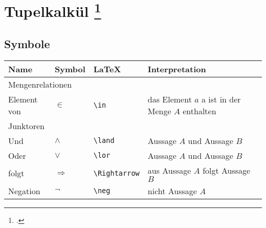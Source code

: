 \documentclass{lehramt-informatik}
\begin{document}

\chapter{Tupelkalkül
\footcite[Seite 100]{kemper}}

%

\section{Symbole}

\begin{tabular}{l|l|l|l}
\textbf{Name} & \textbf{Symbol} & \textbf{LaTeX} & \textbf{Interpretation}\\

\hline
\hline

\multicolumn{4}{l}{Mengenrelationen} \\

\hline
\hline

Element von & $\in$ & \verb|\in| & das Element $a$  a ist in der Menge $A$ enthalten \\

\hline

\multicolumn{4}{l}{Junktoren} \\

\hline
\hline

Und & $\land$ & \verb|\land| & Aussage $A$ und Aussage $B$ \\

Oder & $\lor$ & \verb|\lor| & Aussage $A$ und Aussage $B$ \\

folgt & $\Rightarrow$ & \verb|\Rightarrow| & aus Aussage $A$ folgt Aussage $B$ \\

Negation & $\neg$ & \verb|\neg| & nicht Aussage $A$\\


\end{tabular}
\end{document}
